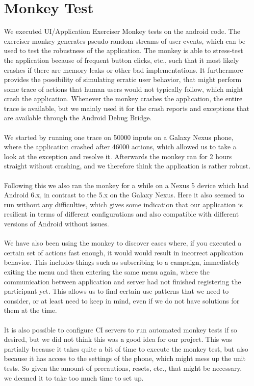 
\section{Monkey Test}
\label{sec:monkey_test}
We executed UI/Application Exerciser Monkey tests on the android code. The exerciser monkey generates pseudo-random streams of user events, which can be used to test the robustness of the application. The monkey is able to stress-test the application because of frequent button clicks, etc., such that it most likely crashes if there are memory leaks or other bad implementations. It furthermore provides the possibility of simulating erratic user behavior, that might perform some trace of actions that human users would not typically follow, which might crash the application. Whenever the monkey crashes the application, the entire trace is available, but we mainly used it for the crash reports and exceptions that are available through the Android Debug Bridge. 
\\\\
We started by running one trace on 50000 inputs on a Galaxy Nexus phone, where the application crashed after 46000 actions, which allowed us to take a look at the exception and resolve it. Afterwards the monkey ran for 2 hours straight without crashing, and we therefore think the application is rather robust.
\\\\
Following this we also ran the monkey for a while on a Nexus 5 device which had Android 6.x, in contrast to the 5.x on the Galaxy Nexus. Here it also seemed to run without any difficulties, which gives some indication that our application is resilient in terms of different configurations and also compatible with different versions of Android without issues.
\\\\
We have also been using the monkey to discover cases where, if you executed a certain set of actions fast enough, it would would result in incorrect application behavior. This includes things such as subscribing to a campaign, immediately exiting the menu and then entering the same menu again, where the communication between application and server had not finished registering the participant yet. This allows us to find certain use patterns that we need to consider, or at least need to keep in mind, even if we do not have solutions for them at the time.
\\\\
It is also possible to configure CI servers to run automated monkey tests if so desired, but we did not think this was a good idea for our project. This was partially because it takes quite a bit of time to execute the monkey test, but also because it has access to the settings of the phone, which might mess up the unit tests. So given the amount of precautions, resets, etc., that might be necessary, we deemed it to take too much time to set up. 

